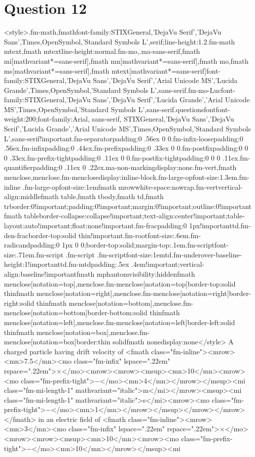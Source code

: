 \documentclass{article}
\begin{document}
\section*{Question 12}
<style>.fm-math,fmath{font-family:STIXGeneral,'DejaVu Serif','DejaVu Sans',Times,OpenSymbol,'Standard Symbols L',serif;line-height:1.2}.fm-math mtext,fmath mtext{line-height:normal}.fm-mo,.ma-sans-serif,fmath mi[mathvariant*=sans-serif],fmath mn[mathvariant*=sans-serif],fmath mo,fmath ms[mathvariant*=sans-serif],fmath mtext[mathvariant*=sans-serif]{font-family:STIXGeneral,'DejaVu Sans','DejaVu Serif','Arial Unicode MS','Lucida Grande',Times,OpenSymbol,'Standard Symbols L',sans-serif}.fm-mo-Luc{font-family:STIXGeneral,'DejaVu Sans','DejaVu Serif','Lucida Grande','Arial Unicode MS',Times,OpenSymbol,'Standard Symbols L',sans-serif}.questionsfont{font-weight:200;font-family:Arial, sans-serif, STIXGeneral,'DejaVu Sans','DejaVu Serif','Lucida Grande','Arial Unicode MS',Times,OpenSymbol,'Standard Symbols L',sans-serif!important}.fm-separator{padding:0 .56ex 0 0}.fm-infix-loose{padding:0 .56ex}.fm-infix{padding:0 .44ex}.fm-prefix{padding:0 .33ex 0 0}.fm-postfix{padding:0 0 0 .33ex}.fm-prefix-tight{padding:0 .11ex 0 0}.fm-postfix-tight{padding:0 0 0 .11ex}.fm-quantifier{padding:0 .11ex 0 .22ex}.ma-non-marking{display:none}.fm-vert,fmath menclose,menclose.fm-menclose{display:inline-block}.fm-large-op{font-size:1.3em}.fm-inline .fm-large-op{font-size:1em}fmath mrow{white-space:nowrap}.fm-vert{vertical-align:middle}fmath table,fmath tbody,fmath td,fmath tr{border:0!important;padding:0!important;margin:0!important;outline:0!important}fmath table{border-collapse:collapse!important;text-align:center!important;table-layout:auto!important;float:none!important}.fm-frac{padding:0 1px!important}td.fm-den-frac{border-top:solid thin!important}.fm-root{font-size:.6em}.fm-radicand{padding:0 1px 0 0;border-top:solid;margin-top:.1em}.fm-script{font-size:.71em}.fm-script .fm-script .fm-script{font-size:1em}td.fm-underover-base{line-height:1!important}td.fm-mtd{padding:.5ex .4em!important;vertical-align:baseline!important}fmath mphantom{visibility:hidden}fmath menclose[notation=top],menclose.fm-menclose[notation=top]{border-top:solid thin}fmath menclose[notation=right],menclose.fm-menclose[notation=right]{border-right:solid thin}fmath menclose[notation=bottom],menclose.fm-menclose[notation=bottom]{border-bottom:solid thin}fmath menclose[notation=left],menclose.fm-menclose[notation=left]{border-left:solid thin}fmath menclose[notation=box],menclose.fm-menclose[notation=box]{border:thin solid}fmath none{display:none}</style> A charged particle having drift velocity of <fmath class="fm-inline"><mrow><mn>7.5</mn><mo class="fm-infix" lspace=".22em" rspace=".22em">×</mo><mrow><mrow><msup><mn>10</mn><mrow><mo class="fm-prefix-tight">−</mo><mn>4</mn></mrow></msup><mi class="fm-mi-length-1" mathvariant="italic">m</mi></mrow><msup><mi class="fm-mi-length-1" mathvariant="italic">s</mi><mrow><mo class="fm-prefix-tight">−</mo><mn>1</mn></mrow></msup></mrow></mrow></fmath> in an electric field of <fmath class="fm-inline"><mrow><mn>3</mn><mo class="fm-infix" lspace=".22em" rspace=".22em">×</mo><mrow><mrow><msup><mn>10</mn><mrow><mo class="fm-prefix-tight">−</mo><mn>10</mn></mrow></msup><mi 
\end{document}
